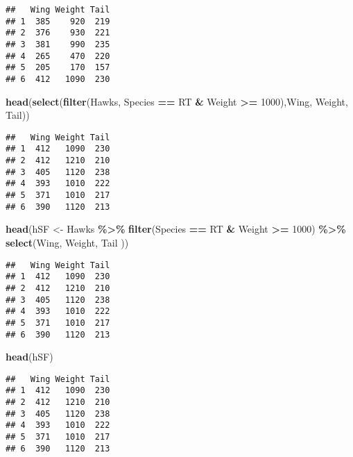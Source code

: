\documentclass[
]{article}
\newenvironment{Shaded}{\begin{snugshade}}{\end{snugshade}}
\newcommand{\DecValTok}[1]{\textcolor[rgb]{0.00,0.00,0.81}{#1}}
\newcommand{\FunctionTok}[1]{\textcolor[rgb]{0.13,0.29,0.53}{\textbf{#1}}}
\newcommand{\NormalTok}[1]{#1}
\newcommand{\OtherTok}[1]{\textcolor[rgb]{0.56,0.35,0.01}{#1}}
\newcommand{\SpecialCharTok}[1]{\textcolor[rgb]{0.81,0.36,0.00}{\textbf{#1}}}
\newcommand{\StringTok}[1]{\textcolor[rgb]{0.31,0.60,0.02}{#1}}
\begin{document}
\begin{verbatim}
##   Wing Weight Tail
## 1  385    920  219
## 2  376    930  221
## 3  381    990  235
## 4  265    470  220
## 5  205    170  157
## 6  412   1090  230
\end{verbatim}

\begin{Shaded}
\begin{Highlighting}[]
\FunctionTok{head}\NormalTok{(}\FunctionTok{select}\NormalTok{(}\FunctionTok{filter}\NormalTok{(Hawks, Species }\SpecialCharTok{==} \StringTok{\textquotesingle{}RT\textquotesingle{}} \SpecialCharTok{\&}\NormalTok{ Weight }\SpecialCharTok{\textgreater{}=} \DecValTok{1000}\NormalTok{),Wing, Weight, Tail))}
\end{Highlighting}
\end{Shaded}

\begin{verbatim}
##   Wing Weight Tail
## 1  412   1090  230
## 2  412   1210  210
## 3  405   1120  238
## 4  393   1010  222
## 5  371   1010  217
## 6  390   1120  213
\end{verbatim}

\begin{Shaded}
\begin{Highlighting}[]
\FunctionTok{head}\NormalTok{(hSF }\OtherTok{\textless{}{-}}\NormalTok{ Hawks }\SpecialCharTok{\%\textgreater{}\%}
  \FunctionTok{filter}\NormalTok{(Species }\SpecialCharTok{==} \StringTok{\textquotesingle{}RT\textquotesingle{}} \SpecialCharTok{\&}\NormalTok{ Weight }\SpecialCharTok{\textgreater{}=} \DecValTok{1000}\NormalTok{) }\SpecialCharTok{\%\textgreater{}\%}
  \FunctionTok{select}\NormalTok{(Wing, Weight, Tail ))}
\end{Highlighting}
\end{Shaded}

\begin{verbatim}
##   Wing Weight Tail
## 1  412   1090  230
## 2  412   1210  210
## 3  405   1120  238
## 4  393   1010  222
## 5  371   1010  217
## 6  390   1120  213
\end{verbatim}

\begin{Shaded}
\begin{Highlighting}[]
\FunctionTok{head}\NormalTok{(hSF)}
\end{Highlighting}
\end{Shaded}

\begin{verbatim}
##   Wing Weight Tail
## 1  412   1090  230
## 2  412   1210  210
## 3  405   1120  238
## 4  393   1010  222
## 5  371   1010  217
## 6  390   1120  213
\end{verbatim}
\end{document}
